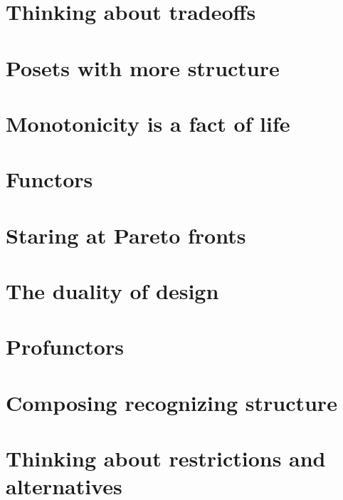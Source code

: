 \documentclass[paper=6in:9in,pagesize=pdftex,
 headinclude=off,footinclude=on,11pt,twoside]{scrbook}
\begin{document}
\chapter{Thinking about tradeoffs}

\clearpage

\chapter{Posets with more structure}

\clearpage

\chapter{Monotonicity is a fact of life}

\clearpage

\chapter{Functors}

\clearpage

\chapter{Staring at Pareto fronts}

\clearpage

\chapter{The duality of design}

\clearpage

\chapter{Profunctors}

\clearpage

\chapter{Composing recognizing structure}

\clearpage

\chapter{Thinking about restrictions and alternatives}

\clearpage
\end{document}
